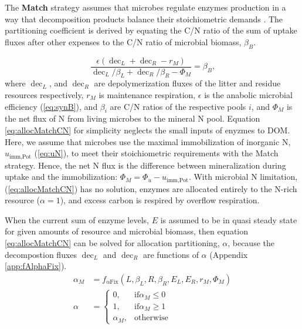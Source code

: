 The \textbf{Match} strategy assumes that microbes regulate enzymes production in
a way that decomposition products balance their stoichiometric demands
\citep{Moorhead12}.
The partitioning coefficient is derived by equating the C/N ratio of the sum of
uptake fluxes after other expenses to the C/N ratio of microbial biomass,
$\beta_B$.

\begin{equation}
\label{eq:allocMatchCN}
\frac{\epsilon (\operatorname{dec}_L + \operatorname{dec}_R - r_M)}{
\operatorname{dec}_L/\beta_L + \operatorname{dec}_R/\beta_R  - \Phi_M } =
\beta_B
\text{,}
\end{equation}
where $\operatorname{dec}_L$, and $\operatorname{dec}_R$ are depolymerization
fluxes of the litter and residue resources respectively, $r_M$ is maintenance
respiration, $\epsilon$ is the anabolic microbial efficiency (\ref{eq:synB}),
and $\beta_i$ are C/N ratios of the respective pools $i$, and $\Phi_M$ is the
net flux of N from living microbes to the mineral N pool. Equation
\ref{eq:allocMatchCN} for simplicity neglects the small inputs of enyzmes to DOM. Here, we assume that
microbes use the maximal immobilization of inorganic N, $u_{\operatorname{imm,Pot}}$ (\ref{eq:uN}), to meet their stoichiometric
requirements with the Match strategy. Hence, the net N flux is the difference
between mineralization during uptake and the immobilization: $\Phi_M = \Phi_u -
u_{\operatorname{imm,Pot}}$. With microbial N limitation,
(\ref{eq:allocMatchCN})  has no solution, enzymes are allocated entirely to
the N-rich resource ($\alpha=1$), and excess carbon is
respired by overflow respiration.

When the current sum of enzyme levels, $E$ is assumed to be in quasi
steady state for given amounts of resource and microbial biomass, then equation
\ref{eq:allocMatchCN} can be solved for allocation partitioning, $\alpha$,
because the decompostion fluxes $\operatorname{dec}_L$ and
$\operatorname{dec}_R$ are functions of $\alpha$ (Appendix
\ref{app:fAlphaFix}).
\begin{subequations}
\label{eq:allocMatch} 
\begin{align}
\alpha_M &= f_{\operatorname{{\alpha}Fix}}(L,\beta_L,R,\beta_R, E_L, E_R, r_M,
\Phi_M)
\\
\alpha &= \begin{cases}
  0,  & \text{if} \alpha_M \le 0 \\
  1,  & \text{if} \alpha_M \ge 1 \\
  \alpha_M, & \text{otherwise}
\end{cases}   
\end{align}
\end{subequations} 

